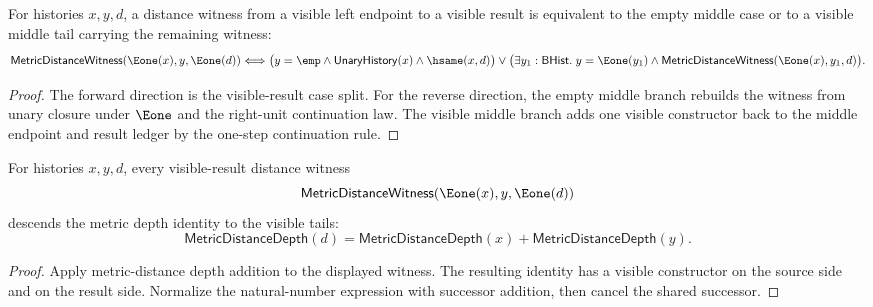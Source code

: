 \begin{theorem}
\label{thm:metric-distance-witness-left-e1-result-iff}
For histories $x,y,d$, a distance witness from a visible left endpoint to a
visible result is equivalent to the empty middle case or to a visible middle
tail carrying the remaining witness:
$$
\mathsf{MetricDistanceWitness}(\Eone(x),y,\Eone(d))
\Longleftrightarrow
\bigl(y=\emp\land\mathsf{UnaryHistory}(x)\land\hsame(x,d)\bigr)
\lor
\bigl(\exists y_1:\mathsf{BHist}.\;
y=\Eone(y_1)\land
\mathsf{MetricDistanceWitness}(\Eone(x),y_1,d)\bigr).
$$
\end{theorem}
\begin{proof}
The forward direction is the visible-result case split. For the reverse
direction, the empty middle branch rebuilds the witness from unary closure
under $\Eone$ and the right-unit continuation law. The visible middle branch
adds one visible constructor back to the middle endpoint and result ledger by
the one-step continuation rule.
\end{proof}

\begin{theorem}
\label{thm:metric-distance-witness-left-e1-result-depth-add}
For histories $x,y,d$, every visible-result distance witness
$$
\mathsf{MetricDistanceWitness}(\Eone(x),y,\Eone(d))
$$
descends the metric depth identity to the visible tails:
$$
\mathsf{MetricDistanceDepth}(d)
=
\mathsf{MetricDistanceDepth}(x)+\mathsf{MetricDistanceDepth}(y).
$$
\end{theorem}
\begin{proof}
Apply metric-distance depth addition to the displayed witness. The resulting
identity has a visible constructor on the source side and on the result side.
Normalize the natural-number expression with successor addition, then cancel
the shared successor.
\end{proof}

